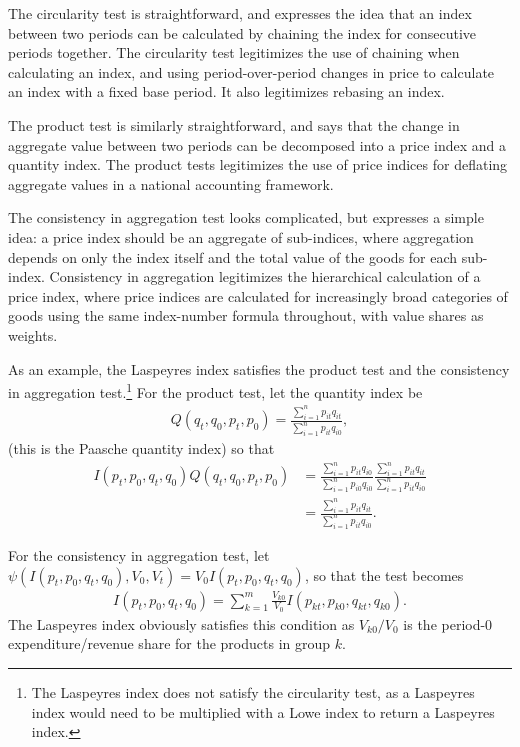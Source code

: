 \documentclass[]{article}
\begin{document}
The circularity test is straightforward, and expresses the idea that an index between two periods can be calculated by chaining the index for consecutive periods together. The circularity test legitimizes the use of chaining when calculating an index, and using period-over-period changes in price to calculate an index with a fixed base period. It also legitimizes rebasing an index.

The product test is similarly straightforward, and says that the change in aggregate value between two periods can be decomposed into a price index and a quantity index. The product tests legitimizes the use of price indices for deflating aggregate values in a national accounting framework.

The consistency in aggregation test looks complicated, but expresses a simple idea: a price index should be an aggregate of sub-indices, where aggregation depends on only the index itself and the total value of the goods for each sub-index. Consistency in aggregation legitimizes the hierarchical calculation of a price index, where price indices are calculated for increasingly broad categories of goods using the same index-number formula throughout, with value shares as weights.

As an example, the Laspeyres index satisfies the product test and the consistency in aggregation test.\footnote{The Laspeyres index does not satisfy the circularity test, as a Laspeyres index would need to be multiplied with a Lowe index to return a Laspeyres index.} For the product test, let the quantity index be
\begin{align*}
Q(q_{t}, q_{0}, p_{t}, p_{0}) = \frac{\sum_{i = 1}^{n} p_{it}q_{it}}{\sum_{i = 1}^{n} p_{it}q_{i0}},
\end{align*}
(this is the Paasche quantity index) so that
\begin{align*}
I(p_{t}, p_{0}, q_{t}, q_{0}) Q(q_{t}, q_{0}, p_{t}, p_{0}) &= \frac{\sum_{i = 1}^{n} p_{it}q_{i0}}{\sum_{i = 1}^{n} p_{i0}q_{i0}} \frac{\sum_{i = 1}^{n} p_{it}q_{it}}{\sum_{i = 1}^{n} p_{it}q_{i0}} \\
&= \frac{\sum_{i = 1}^{n} p_{it}q_{it}}{\sum_{i = 1}^{n} p_{it}q_{i0}}.
\end{align*}

For the consistency in aggregation test, let \(\psi(I(p_{t}, p_{0}, q_{t}, q_{0}), V_{0}, V_{t}) = V_0 I(p_{t}, p_{0}, q_{t}, q_{0})\), so that the test becomes
\begin{align*}
I(p_{t}, p_{0}, q_{t}, q_{0}) = \sum_{k = 1}^{m} \frac{V_{k0}}{V_0} I(p_{kt}, p_{k0}, q_{kt}, q_{k0}).
\end{align*}
The Laspeyres index obviously satisfies this condition as \(V_{k0} / V_0\) is the period-0 expenditure/revenue share for the products in group \(k\).
\end{document}

